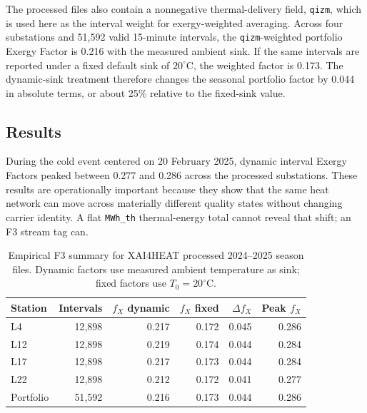 \documentclass[11pt]{article}
\newcommand{\degC}{^{\circ}\mathrm{C}}
\begin{document}
The processed files also contain a nonnegative thermal-delivery field, \texttt{qizm}, which is used here as the interval weight for exergy-weighted averaging. Across four substations and 51{,}592 valid 15-minute intervals, the \texttt{qizm}-weighted portfolio Exergy Factor is 0.216 with the measured ambient sink. If the same intervals are reported under a fixed default sink of $20\degC$, the weighted factor is 0.173. The dynamic-sink treatment therefore changes the seasonal portfolio factor by 0.044 in absolute terms, or about 25\% relative to the fixed-sink value.

\subsection{Results}

During the cold event centered on 20 February 2025, dynamic interval Exergy Factors peaked between 0.277 and 0.286 across the processed substations. These results are operationally important because they show that the same heat network can move across materially different quality states without changing carrier identity. A flat \texttt{MWh\_th} thermal-energy total cannot reveal that shift; an F3 stream tag can.

\begin{table}[H]
\centering
\small
\caption{Empirical F3 summary for XAI4HEAT processed 2024--2025 season files. Dynamic factors use measured ambient temperature as sink; fixed factors use $T_0=20\degC$.}
\label{tab:xai4heat_summary}
\begin{tabular}{@{}lrrrrr@{}}
\toprule
Station & Intervals & $f_X$ dynamic & $f_X$ fixed & $\Delta f_X$ & Peak $f_X$ \\
\midrule
L4 & 12{,}898 & 0.217 & 0.172 & 0.045 & 0.286 \\
L12 & 12{,}898 & 0.219 & 0.174 & 0.044 & 0.284 \\
L17 & 12{,}898 & 0.217 & 0.173 & 0.044 & 0.284 \\
L22 & 12{,}898 & 0.212 & 0.172 & 0.041 & 0.277 \\
Portfolio & 51{,}592 & 0.216 & 0.173 & 0.044 & 0.286 \\
\bottomrule
\end{tabular}
\end{table}
\end{document}
